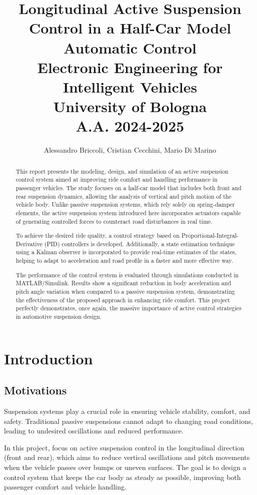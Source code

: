 \documentclass[]{report}
\title{{\huge  Longitudinal Active Suspension Control in a Half-Car Model } \\
	{\small Automatic Control\\
		Electronic Engineering for Intelligent Vehicles\\
		University of Bologna\\
		A.A. 2024-2025}}
\author{Alessandro Briccoli, Cristian Cecchini, Mario Di Marino}
\begin{document}
	
	\maketitle
	
	\begin{abstract}
		This report presents the modeling, design, and simulation of an active suspension control system aimed at improving ride comfort and handling performance in passenger vehicles. The study focuses on a half-car model that includes both front and rear suspension dynamics, allowing the analysis of vertical and pitch motion of the vehicle body. Unlike passive suspension systems, which rely solely on spring-damper elements, the active suspension system introduced here incorporates actuators capable of generating controlled forces to counteract road disturbances in real time.
		
		To achieve the desired ride quality, a control strategy based on Proportional-Integral-Derivative (PID) controllers is developed.  Additionally, a state estimation technique using a Kalman observer is incorporated to provide real-time estimates of the states, helping to adapt to acceleration and road profile in a faster and more effective way.
		
		The performance of the control system is evaluated through simulations conducted in MATLAB/Simulink. Results show a significant reduction in body acceleration and pitch angle variation when compared to a passive suspension system, demonstrating the effectiveness of the proposed approach in enhancing ride comfort. This project perfectly demonstrates, once again, the massive importance of active control strategies in automotive suspension design.
	\end{abstract}
	
	\chapter{Introduction}
\section{Motivations}
Suspension systems play a crucial role in ensuring vehicle stability, comfort, and safety. Traditional passive suspensions cannot adapt to changing road conditions, leading to undesired oscillations and reduced performance. 

In this project, focus on active suspension control in the longitudinal direction (front and rear), which aims to reduce vertical oscillations and pitch movements when the vehicle passes over bumps or uneven surfaces. The goal is to design a control system that keeps the car body as steady as possible, improving both passenger comfort and vehicle handling.
\end{document}
